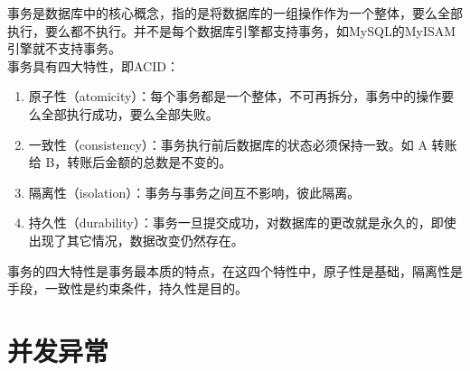 \documentclass[12pt, openany, oneside]{book}
\begin{document}
事务是数据库中的核心概念，指的是将数据库的一组操作作为一个整体，要么全部执行，要么都不执行。并不是每个数据库引擎都支持事务，如MySQL的MyISAM引擎就不支持事务。\\

事务具有四大特性，即ACID：

\begin{enumerate}
	\item 原子性（atomicity）：每个事务都是一个整体，不可再拆分，事务中的操作要么全部执行成功，要么全部失败。

	\item 一致性（consistency）：事务执行前后数据库的状态必须保持一致。如 A 转账给 B，转账后金额的总数是不变的。

	\item 隔离性（isolation）：事务与事务之间互不影响，彼此隔离。

	\item 持久性（durability）：事务一旦提交成功，对数据库的更改就是永久的，即使出现了其它情况，数据改变仍然存在。
\end{enumerate}

事务的四大特性是事务最本质的特点，在这四个特性中，原子性是基础，隔离性是手段，一致性是约束条件，持久性是目的。

\begin{table}[H]
	\centering
	\caption{事务控制语句}
\end{table}

\vspace{0.5cm}

\section{并发异常}
\end{document}
